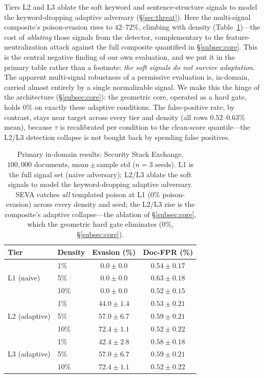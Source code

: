\documentclass[conference]{IEEEtran}
\begin{document}
Tiers L2 and L3 ablate the soft keyword and sentence-structure signals to model
the keyword-dropping adaptive adversary (\S\ref{sec:threat}). Here the multi-signal
composite's poison-evasion rises to $42$--$72\%$, climbing with density
(Table~\ref{tab:main})---the cost of \emph{ablating} those signals from the detector,
complementary to the feature-neutralization attack against the full composite quantified
in \S\ref{subsec:core}.
This is the central negative finding of our own evaluation, and we put it in the
primary table rather than a footnote: \emph{the soft signals do not survive
adaptation}. The apparent multi-signal robustness of a permissive evaluation is,
in-domain, carried almost entirely by a single normalizable signal. We make this
the hinge of the architecture (\S\ref{subsec:core}): the geometric core, operated
as a hard gate, holds $0\%$ on exactly these adaptive conditions. The
false-positive rate, by contrast, stays near target across every tier and density
(all rows $0.52$--$0.63\%$ mean), because $\tau$ is recalibrated per condition to
the clean-score quantile---the L2/L3 detection collapse is not bought back by
spending false positives.

\begin{table}[t]
\centering
\caption{Primary in-domain results: Security Stack Exchange, $100{,}000$
documents, mean\,$\pm$\,sample std ($n=3$ seeds). L1 is the full signal set (naive
adversary); L2/L3 ablate the soft signals to model the keyword-dropping adaptive
adversary. SEVA catches \emph{all} templated poison at L1 ($0\%$ poison-evasion)
across every density and seed; the L2/L3 rise is the composite's adaptive collapse---the
ablation of \S\ref{subsec:core}, which the geometric hard gate eliminates
($0\%$, \S\ref{subsec:core}).}
\label{tab:main}
\begin{tabular}{llcc}
\toprule
Tier & Density & Evasion (\%) & Doc-FPR (\%) \\
\midrule
\multirow{3}{*}{L1 (naive)}    & 1\%  & $\mathbf{0.0\pm0.0}$ & $0.54\pm0.17$ \\
                               & 5\%  & $\mathbf{0.0\pm0.0}$ & $0.63\pm0.18$ \\
                               & 10\% & $\mathbf{0.0\pm0.0}$ & $0.52\pm0.15$ \\
\midrule
\multirow{3}{*}{L2 (adaptive)} & 1\%  & $44.0\pm1.4$ & $0.53\pm0.21$ \\
                               & 5\%  & $57.0\pm6.7$ & $0.59\pm0.21$ \\
                               & 10\% & $72.4\pm1.1$ & $0.52\pm0.22$ \\
\midrule
\multirow{3}{*}{L3 (adaptive)} & 1\%  & $42.4\pm2.8$ & $0.58\pm0.18$ \\
                               & 5\%  & $57.0\pm6.7$ & $0.59\pm0.21$ \\
                               & 10\% & $72.4\pm1.1$ & $0.52\pm0.22$ \\
\bottomrule
\end{tabular}
\end{table}
\end{document}
